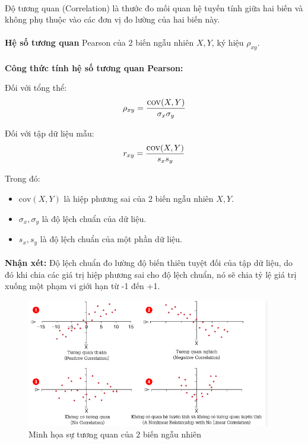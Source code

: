\paragraph{}{Độ tương quan (Correlation) là thước đo mối quan hệ tuyến tính giữa hai biến và không phụ thuộc vào các đơn vị đo lường của hai biến này.}
\paragraph{}{\textbf{Hệ số tương quan} Pearson của 2 biến ngẫu nhiên $X,Y$, ký hiệu $\rho_{xy}$.}

\paragraph{}{\textbf{Công thức tính hệ số tương quan Pearson:}}

Đối với tổng thể:\\
\[
\large \rho_{xy} = \frac{\text{cov}(X,Y)}{\sigma_x \sigma_y}
\]

Đối với tập dữ liệu mẫu:\\
\[
\large r_{xy} = \frac{\text{cov}(X,Y)}{s_x s_y}
\]

Trong đó:
\begin{itemize}
    \item $\text{cov}(X, Y)$ là hiệp phương sai của 2 biến ngẫu nhiên $X, Y$.
    \item $\sigma_x, \sigma_y$ là độ lệch chuẩn của dữ liệu.
    \item $s_x, s_y$ là độ lệch chuẩn của một phần dữ liệu.
\end{itemize}

\paragraph{}{\textbf{Nhận xét:} Độ lệch chuẩn đo lường độ biến thiên tuyệt đối của tập dữ liệu, do đó khi chia các giá trị hiệp phương sai cho độ lệch chuẩn, nó sẽ chia tỷ lệ giá trị xuống một phạm vi giới hạn từ -1 đến +1.}

\begin{figure}[H]
    \centering
    \includegraphics[width=0.95\textwidth]{img/corelation.png}
    \caption{Minh họa sự tương quan của 2 biến ngẫu nhiên}
    \label{fig:correlation_visualization}
\end{figure}



